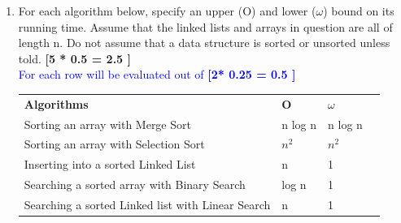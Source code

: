 \documentclass[12pt ,a4paper]{exam}
\begin{document}
	\begin{enumerate}[start=1,label={\bfseries Q\arabic*)}]
			\item For each algorithm below, specify an upper (O) and lower ($\omega$) bound on its running time.  Assume that the linked lists and arrays in question are all of length n. Do not assume that a data structure is sorted or unsorted unless told. \hfill \textbf{ [5 * 0.5 = 2.5 ]}	\\
			 \textcolor{blue}{For each row will be evaluated out of  \hfill\textbf{ [2* 0.25 = 0.5 ]}	}
			\begin{table}[h]
				\centering
				\begin{tabular}{|l|l|l|l}
					\cline{1-3}
					\textbf{Algorithms} & \textbf{O} & \textbf{$\omega$}  &  \\ \cline{1-3}
					Sorting an array with Merge Sort& n log n  &  n log n   &  \\ \cline{1-3} 
					Sorting an array with Selection Sort& $n^2$  & $n^2$   &  \\ \cline{1-3}
					Inserting into a sorted Linked List&  n &  1 &  \\ \cline{1-3}
					Searching a sorted array with Binary Search&  log n  &  1 &  \\ \cline{1-3}
					Searching a sorted Linked list with Linear Search&  n &  1  &  \\ \cline{1-3}
				\end{tabular}
			
			\end{table}\\
		 

\end{enumerate}
\end{document}
